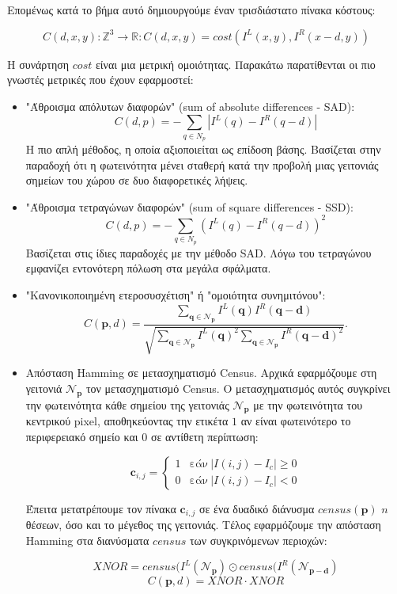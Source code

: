 Επομένως κατά το βήμα αυτό δημιουργούμε έναν τρισδιάστατο πίνακα κόστους:

$$ C(d,x,y) : \mathbb{Z}^3 \rightarrow \mathbb{R} : C(d,x,y) = cost(I^L(x,y),I^R(x-d,y))$$

Η συνάρτηση $cost$ είναι μια μετρική ομοιότητας. Παρακάτω παρατίθενται οι πιο γνωστές μετρικές που έχουν εφαρμοστεί:

\begin{itemize}
\item "Άθροισμα απόλυτων διαφορών" (\e sum of absolute differences - SAD):\citep{hannah1974computer}
$$ C(d,p) = -\sum_{q \in N_p} |I^L(q) - I^R(q-d)| $$ \g
Η πιο απλή μέθοδος, η οποία αξιοποιείται ως επίδοση βάσης. Βασίζεται στην παραδοχή ότι η φωτεινότητα μένει σταθερή κατά την προβολή μιας γειτονιάς σημείων του χώρου σε δυο διαφορετικές λήψεις.

\item "Άθροισμα τετραγώνων διαφορών" (\e sum of square differences - SSD):\citep{kanade1997development}
$$ C(d,p) = -\sum_{q \in N_p} { \left( I^L(q) - I^R(q-d) \right) }^2 $$ \g
Βασίζεται στις ίδιες παραδοχές με την μέθοδο \e SAD. \g Λόγω του τετραγώνου εμφανίζει εντονότερη πόλωση στα μεγάλα σφάλματα.

\item "Κανονικοποιημένη ετεροσυσχέτιση" ή "ομοιότητα συνημιτόνου":
\begin{equation*}
C(\mathbf{p}, d) = \frac{\sum_{\mathbf{q} \in \mathcal{N}_{\mathbf{p}}} I^L(\mathbf{q}) I^R(\mathbf{q} - \mathbf{d})}
{\sqrt{\sum_{\mathbf{q} \in \mathcal{N}_{\mathbf{p}}} I^L(\mathbf{q})^2 \sum_{\mathbf{q} \in \mathcal{N}_{\mathbf{p}}} I^R(\mathbf{q} - \mathbf{d})^2 }}.
\end{equation*}

\item Απόσταση \e Hamming \g σε μετασχηματισμό \e Census. \g Αρχικά εφαρμόζουμε στη γειτονιά $\mathcal{N}_{\mathbf{p}}$ τον μετασχηματισμό \e Census. \g Ο μετασχηματισμός αυτός συγκρίνει την φωτεινότητα κάθε σημείου της γειτονιάς $\mathcal{N}_{\mathbf{p}}$ με την φωτεινότητα του κεντρικού \e pixel, \g αποθηκεύοντας την ετικέτα $1$ αν είναι φωτεινότερο το περιφερειακό σημείο και $0$ σε αντίθετη περίπτωση:

\begin{equation*}
	\mathbf{c}_{i,j} = \begin{cases}
		1 & \text{εάν} \: |I(i,j) - I_c| \geqslant 0\\
		0 & \text{εάν} \: |I(i,j) - I_c| < 0
	\end{cases}
\end{equation*}

Έπειτα μετατρέπουμε τον πίνακα $\mathbf{c}_{i,j}$ σε ένα δυαδικό διάνυσμα $census(\mathbf{p})$ $n$ θέσεων, όσο και το μέγεθος της γειτονιάς. Τέλος εφαρμόζουμε την απόσταση \e Hamming \g στα διανύσματα $census$ των συγκρινόμενων περιοχών:

$$XNOR = census(I^L(\mathcal{N}_{\mathbf{p}}) \odot census(I^R(\mathcal{N}_{\mathbf{\mathbf{p} - \mathbf{d}}}) $$
$$C(\mathbf{p}, d) = XNOR\cdot XNOR$$
\end{itemize}

